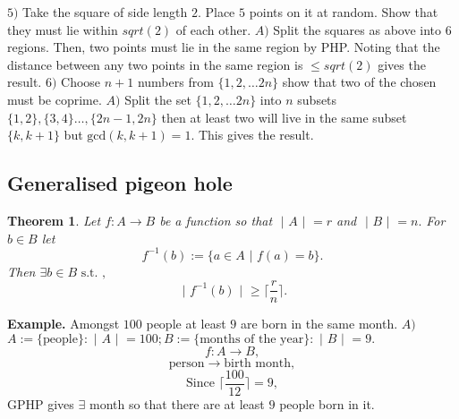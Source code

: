 \documentclass{article}
\newtheorem{theorem}{Theorem}                                       %
\begin{document}
\newline
\newline
$5) $ Take the square of side length $2$. Place $5$ points on it at random. Show that they must lie within $sqrt(2)$ of each other.
\newline
\newline
$A) $ Split the squares as above into $6$ regions. Then, two points must lie in the same region 
by PHP. Noting that the distance between any two points in the same region is $\leq sqrt(2)$ gives the result. 
\newline
\newline
$6) $ Choose $n + 1$ numbers from $\{ 1, 2, \dots 2n \}$ show that two of the chosen must be coprime. 
\newline
\newline
$A) $ Split the set $\{1, 2, \dots 2n \}$ into $n$ subsets $\{1, 2\}, \{3, 4\} \dots, \{2n - 1, 2n\}$  then at least
two will live in the same subset $\{k, k + 1\}$ but $\text{gcd}(k, k + 1) = 1$. This gives the result.
\newpage
\subsection{Generalised pigeon hole} 
\begin{theorem}
  Let $f: A \rightarrow B$ be a function so that $\text{ | } A \text{ | } = r$ and $\text{ | } B \text{ | } = n.$ 
  For $b \in B$ let 
  $$f^{-1}(b) := \{ a \in A \text{ | } f(a) = b\}.$$
  Then $\exists b \in B \text{ s.t. },$
  $$\text{ | } f^{-1}(b) \text{ | } \geq \lceil \frac{r}{n} \rceil.$$
\end{theorem}
\textbf{Example. } Amongst $100$ people at least $9$ are born in the same month.
\newline
\newline
$A) $ $A := \{ \text{people} \}: \text{ | } A \text{ | } = 100; B := \{\text{months of the year}\}: \text{ | } B \text{ | } = 9.$
$$f: A \rightarrow B,$$
$$\text{person} \rightarrow \text{birth month},$$
$$\text{Since } \lceil \frac{100}{12} \rceil = 9,$$
GPHP gives $\exists$ month so that there are at least $9$ people born in it. 
\newpage
\end{document}
